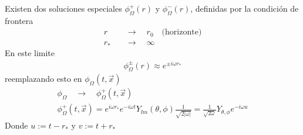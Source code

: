 \documentclass{article}
\begin{document}
\hfill 

\hfill

Existen dos soluciones especiales $ \phi_\Omega^+ (r)  $ y $ \phi_\Omega^- (r) $, definidas por la condición de frontera 
\begin{align*}
  r \quad &\rightarrow \quad r_0 \quad \text{(horizonte)} \\
  r_* \quad &\rightarrow \quad \infty
\end{align*}
En este limite 
\begin{gather*}
  \phi_\Omega^\pm(r) \approx e ^ {\pm i \omega r_* }
\end{gather*}
reemplazando esto en $ \phi_\Omega (t, \vec x )  $
\begin{gather*}
  \phi_\Omega \quad \rightarrow \quad \phi^+_\Omega (t,\vec x)  \\
  \phi_\Omega^+ (t,\vec x) = e ^ {i \omega r_* } e ^ {-i\omega t } Y _{lm } (\theta, \phi) \frac{1}{\sqrt{2 \left|\omega \right|} } = \frac{1}{\sqrt{2\omega} } Y _{\theta,\phi }  e ^ {-i \omega u }
\end{gather*}
Donde $ u := t-r_*  $ y $ v:= t+r_*  $
\end{document}
